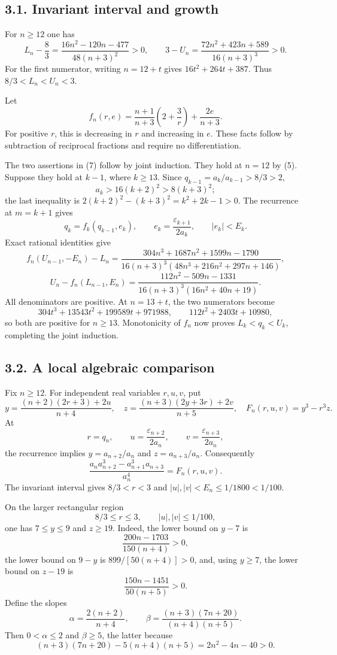 \documentclass[
  11pt,
  a4paper,
]{article}
\begin{document}
\subsection{3.1. Invariant interval and
growth}\label{invariant-interval-and-growth}

For \(n\ge12\) one has \[
L_n-\frac83=\frac{16n^2-120n-477}{48(n+3)^2}>0,
\qquad
3-U_n=\frac{72n^2+423n+589}{16(n+3)^3}>0.
\tag{12}
\] For the first numerator, writing \(n=12+t\) gives \(16t^2+264t+387\).
Thus \(8/3<L_n<U_n<3\).

Let \[
f_n(r,e)=\frac{n+1}{n+3}\left(2+\frac3r\right)+\frac{2e}{n+3}.
\] For positive \(r\), this is decreasing in \(r\) and increasing in
\(e\). These facts follow by subtraction of reciprocal fractions and
require no differentiation.

The two assertions in (7) follow by joint induction. They hold at
\(n=12\) by (5). Suppose they hold at \(k-1\), where \(k\ge13\). Since
\(q_{k-1}=a_k/a_{k-1}>8/3>2\), \[
a_k>16(k+2)^2>8(k+3)^2;
\] the last inequality is \(2(k+2)^2-(k+3)^2=k^2+2k-1>0\). The
recurrence at \(m=k+1\) gives \[
q_k=f_k(q_{k-1},e_k),\qquad e_k=\frac{\varepsilon_{k+1}}{2a_k},
\qquad |e_k|<E_k.
\] Exact rational identities give \[
f_n(U_{n-1},-E_n)-L_n
=\frac{304n^3+1687n^2+1599n-1790}
{16(n+3)^3(48n^3+216n^2+297n+146)},
\tag{13}
\] \[
U_n-f_n(L_{n-1},E_n)
=\frac{112n^2-509n-1331}
{16(n+3)^3(16n^2+40n+19)}.
\tag{14}
\] All denominators are positive. At \(n=13+t\), the two numerators
become \[
304t^3+13543t^2+199589t+971988,
\qquad112t^2+2403t+10980,
\] so both are positive for \(n\ge13\). Monotonicity of \(f_n\) now
proves \(L_k<q_k<U_k\), completing the joint induction.

\subsection{3.2. A local algebraic
comparison}\label{a-local-algebraic-comparison}

Fix \(n\ge12\). For independent real variables \(r,u,v\), put \[
y=\frac{(n+2)(2r+3)+2u}{n+4},\quad
z=\frac{(n+3)(2y+3r)+2v}{n+5},\quad
F_n(r,u,v)=y^3-r^3z.
\tag{15}
\] At \[
r=q_n,\qquad u=\frac{\varepsilon_{n+2}}{2a_n},\qquad
v=\frac{\varepsilon_{n+3}}{2a_n},
\] the recurrence implies \(y=a_{n+2}/a_n\) and \(z=a_{n+3}/a_n\).
Consequently \[
\frac{a_na_{n+2}^3-a_{n+1}^3a_{n+3}}{a_n^4}=F_n(r,u,v).
\tag{16}
\] The invariant interval gives \(8/3<r<3\) and
\(|u|,|v|<E_n\le1/1800<1/100\).

On the larger rectangular region \[
8/3\le r\le3,\qquad |u|,|v|\le1/100,
\tag{17}
\] one has \(7\le y\le9\) and \(z\ge19\). Indeed, the lower bound on
\(y-7\) is \[
\frac{200n-1703}{150(n+4)}>0,
\] the lower bound on \(9-y\) is \(899/[50(n+4)]>0\), and, using
\(y\ge7\), the lower bound on \(z-19\) is \[
\frac{150n-1451}{50(n+5)}>0.
\] Define the slopes \[
\alpha=\frac{2(n+2)}{n+4},\qquad
\beta=\frac{(n+3)(7n+20)}{(n+4)(n+5)}.
\] Then \(0<\alpha\le2\) and \(\beta\ge5\), the latter because \[
(n+3)(7n+20)-5(n+4)(n+5)=2n^2-4n-40>0.
\]
\end{document}
